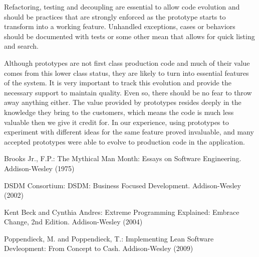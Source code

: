 \documentclass[lnbip]{svmultln}
\begin{document}
Refactoring, testing and decoupling are essential to allow code
evolution and should be practices that are strongly enforced as the prototype 
starts to transform into a working feature. 
Unhandled exceptions, cases or behaviors should be
documented with tests or some other mean that allows for
quick listing and search.

Although prototypes are not first class production code and much of
their value comes from this lower class status, they are likely to
turn into essential features of the system. It
is very important to track this evolution and provide the necessary support
to maintain quality. Even so, there should be no fear to throw away anything either.
The value provided by prototypes resides deeply in the knowledge they
bring to the customers, which means the code is much less valuable
then we give it credit for. In our experience, using prototypes to experiment
with different ideas for the same feature proved invaluable, and many accepted
prototypes were able to evolve to production code in the application.

%
%
\begin{thebibliography}{5}

 Brooks Jr., F.P.: The Mythical Man Month: Essays
  on Software Engineering. Addison-Wesley (1975)

 DSDM Consortium: DSDM: Business Focused
  Development. Addison-Wesley (2002)
  
 Kent Beck and Cynthia Andres: Extreme Programming Explained: Embrace Change, 2nd Edition. Addison-Wesley (2004)  




 Poppendieck, M. and Poppendieck, T.:
  Implementing Lean Software Devleopment: From Concept to
  Cash. Addison-Wesley (2009)

\end{thebibliography}
%
\end{document}
